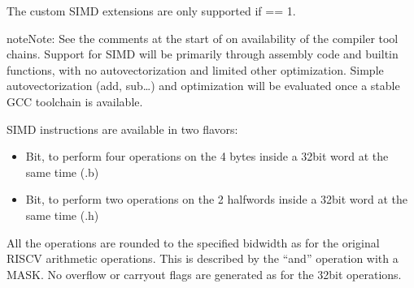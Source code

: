 \documentclass[letterpaper,10pt,english]{sphinxmanual}
\begin{document}
\sphinxAtStartPar
The custom SIMD extensions are only supported if  == 1.

\begin{sphinxadmonition}{note}{Note:}
\sphinxAtStartPar
See the comments at the start of {\hyperref[\detokenize{instruction_set_extensions:custom-isa-extensions}]{}} on availability of the compiler tool chains.
Support for SIMD will be primarily through assembly code and builtin functions, with no auto\sphinxhyphen{}vectorization and limited other optimization.
Simple auto\sphinxhyphen{}vectorization (add, sub…) and optimization will be evaluated once a stable GCC toolchain is available.
\end{sphinxadmonition}

\sphinxAtStartPar
SIMD instructions are available in two flavors:
\begin{itemize}
\item {} 
\sphinxhyphen{}Bit, to perform four operations on the 4 bytes inside a 32\sphinxhyphen{}bit word
at the same time (.b)

\item {} 
\sphinxhyphen{}Bit, to perform two operations on the 2 half\sphinxhyphen{}words inside a 32\sphinxhyphen{}bit
word at the same time (.h)

\end{itemize}

\sphinxAtStartPar
All the operations are rounded to the specified bidwidth as for the original
RISC\sphinxhyphen{}V arithmetic operations. This is described by the “and” operation with a
MASK. No overflow or carry\sphinxhyphen{}out flags are generated as for the 32\sphinxhyphen{}bit operations.
\end{document}
